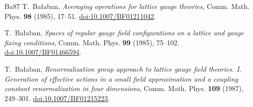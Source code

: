 \documentclass[11pt,letterpaper,reqno]{amsart}
\numberwithin{equation}{section}
\theoremstyle{definition}
\theoremstyle{remark}
\begin{document}
\endgroup

\begin{thebibliography}{Ba87}
\small
{}
T.~Ba{\l}aban, \emph{Averaging operations for lattice gauge theories},
Comm. Math. Phys. \textbf{98} (1985), 17--51.
\href{https://doi.org/10.1007/BF01211042}{doi:10.1007/BF01211042}.

T.~Ba{\l}aban, \emph{Spaces of regular gauge field configurations on
a lattice and gauge fixing conditions},
Comm. Math. Phys. \textbf{99} (1985), 75--102.
\href{https://doi.org/10.1007/BF01466594}{doi:10.1007/BF01466594}.

T.~Ba{\l}aban, \emph{Renormalization group approach to lattice gauge
field theories. I. Generation of effective actions in a small field
approximation and a coupling constant renormalization in four
dimensions}, Comm. Math. Phys. \textbf{109} (1987), 249--301.
\href{https://doi.org/10.1007/BF01215223}{doi:10.1007/BF01215223}.
\end{thebibliography}
\end{document}
